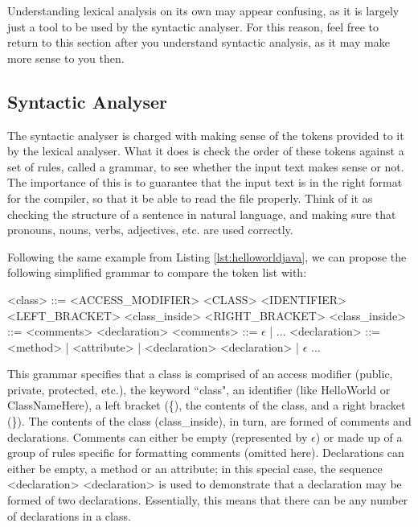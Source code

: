 Understanding lexical analysis on its own may appear confusing, as it is largely just a tool to be used by the syntactic analyser. For this reason, feel free to return to this section after you understand syntactic analysis, as it may make more sense to you then.


\subsection{Syntactic Analyser}

The syntactic analyser is charged with making sense of the tokens provided to it by the lexical analyser. What it does is check the order of these tokens against a set of rules, called a grammar, to see whether the input text makes sense or not. The importance of this is to guarantee that the input text is in the right format for the compiler, so that it be able to read the file properly. Think of it as checking the structure of a sentence in natural language, and making sure that pronouns, nouns, verbs, adjectives, etc. are used correctly.

Following the same example from Listing \ref{lst:helloworldjava}, we can propose the following simplified grammar to compare the token list with:

\begin{listing}
\begin{grammar}
<class> ::= <ACCESS_MODIFIER> <CLASS> <IDENTIFIER> <LEFT_BRACKET> <class_inside> <RIGHT_BRACKET>
\alt<class_inside> ::= <comments> <declaration>
\alt<comments> ::= $\epsilon$ | ...
\alt<declaration> ::= <method> | <attribute> | <declaration> <declaration> | $\epsilon$
\alt...
\end{grammar}
\end{listing}

This grammar specifies that a class is comprised of an access modifier (public, private, protected, etc.), the keyword ``class", an identifier (like HelloWorld or ClassNameHere), a left bracket (\{), the contents of the class, and a right bracket (\}). The contents of the class (class_inside), in turn, are formed of comments and declarations. Comments can either be empty (represented by $\epsilon$) or made up of a group of rules specific for formatting comments (omitted here). Declarations can either be empty, a method or an attribute; in this special case, the sequence <declaration> <declaration> is used to demonstrate that a declaration may be formed of two declarations. Essentially, this means that there can be any number of declarations in a class.

